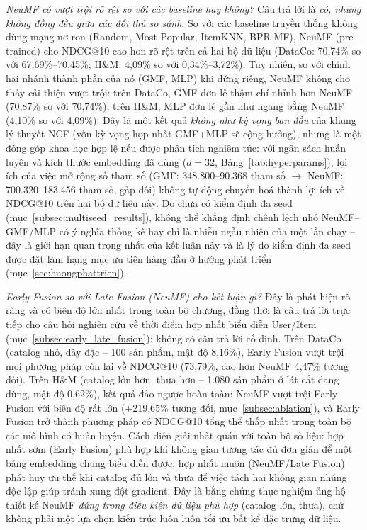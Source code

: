 \textit{NeuMF có vượt trội rõ rệt so với các baseline hay không?} Câu trả lời là \emph{có, nhưng không đồng đều giữa các đối thủ so sánh}. So với các baseline truyền thống không dùng mạng nơ-ron (Random, Most Popular, ItemKNN, BPR-MF), NeuMF (pre-trained) cho NDCG@10 cao hơn rõ rệt trên cả hai bộ dữ liệu (DataCo: 70,74\% so với 67,69\%--70,45\%; H\&M: 4,09\% so với 0,34\%--3,72\%). Tuy nhiên, so với chính hai nhánh thành phần của nó (GMF, MLP) khi đứng riêng, NeuMF không cho thấy cải thiện vượt trội: trên DataCo, GMF đơn lẻ thậm chí nhỉnh hơn NeuMF (70,87\% so với 70,74\%); trên H\&M, MLP đơn lẻ gần như ngang bằng NeuMF (4,10\% so với 4,09\%). Đây là một kết quả \emph{không như kỳ vọng ban đầu} của khung lý thuyết NCF (vốn kỳ vọng hợp nhất GMF+MLP sẽ cộng hưởng), nhưng là một đóng góp khoa học hợp lệ nếu được phân tích nghiêm túc: với ngân sách huấn luyện và kích thước embedding đã dùng ($d=32$, Bảng~\ref{tab:hyperparams}), lợi ích của việc mở rộng số tham số (GMF: 348.800--90.368 tham số $\to$ NeuMF: 700.320--183.456 tham số, gấp đôi) không tự động chuyển hoá thành lợi ích về NDCG@10 trên hai bộ dữ liệu này. Do chưa có kiểm định đa seed (mục~\ref{subsec:multiseed_results}), không thể khẳng định chênh lệch nhỏ NeuMF--GMF/MLP có ý nghĩa thống kê hay chỉ là nhiễu ngẫu nhiên của một lần chạy -- đây là giới hạn quan trọng nhất của kết luận này và là lý do kiểm định đa seed được đặt làm hạng mục ưu tiên hàng đầu ở hướng phát triển (mục~\ref{sec:huongphattrien}).

\textit{Early Fusion so với Late Fusion (NeuMF) cho kết luận gì?} Đây là phát hiện rõ ràng và có biên độ lớn nhất trong toàn bộ chương, đồng thời là câu trả lời trực tiếp cho câu hỏi nghiên cứu về thời điểm hợp nhất biểu diễn User/Item (mục~\ref{subsec:early_late_fusion}): không có câu trả lời cố định. Trên DataCo (catalog nhỏ, dày đặc -- 100 sản phẩm, mật độ 8,16\%), Early Fusion vượt trội mọi phương pháp còn lại về NDCG@10 (73,79\%, cao hơn NeuMF 4,47\% tương đối). Trên H\&M (catalog lớn hơn, thưa hơn -- 1.080 sản phẩm ở lát cắt đang dùng, mật độ 0,62\%), kết quả đảo ngược hoàn toàn: NeuMF vượt trội Early Fusion với biên độ rất lớn (+219,65\% tương đối, mục~\ref{subsec:ablation}), và Early Fusion trở thành phương pháp có NDCG@10 tổng thể thấp nhất trong toàn bộ các mô hình có huấn luyện. Cách diễn giải nhất quán với toàn bộ số liệu: hợp nhất sớm (Early Fusion) phù hợp khi không gian tương tác đủ đơn giản để một bảng embedding chung biểu diễn được; hợp nhất muộn (NeuMF/Late Fusion) phát huy ưu thế khi catalog đủ lớn và thưa để việc tách hai không gian nhúng độc lập giúp tránh xung đột gradient. Đây là bằng chứng thực nghiệm ủng hộ thiết kế NeuMF \emph{đúng trong điều kiện dữ liệu phù hợp} (catalog lớn, thưa), chứ không phải một lựa chọn kiến trúc luôn luôn tối ưu bất kể đặc trưng dữ liệu.

